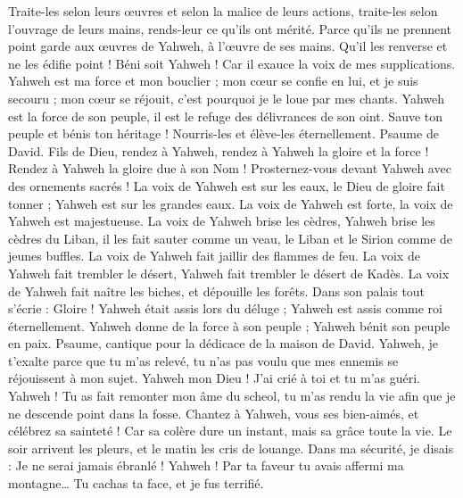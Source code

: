 \begin{multicols}{2}
Traite-les selon leurs œuvres et selon la malice de leurs actions, traite-les selon l'ouvrage de leurs mains, rends-leur ce qu'ils ont mérité.
Parce qu'ils ne prennent point garde aux œuvres de Yahweh, à l'œuvre de ses mains. Qu’il les renverse et ne les édifie point !
Béni soit Yahweh ! Car il exauce la voix de mes supplications.
Yahweh est ma force et mon bouclier ; mon cœur se confie en lui, et je suis secouru ; mon cœur se réjouit, c'est pourquoi je le loue par mes chants.
Yahweh est la force de son peuple, il est le refuge des délivrances de son oint.
Sauve ton peuple et bénis ton héritage ! Nourris-les et élève-les éternellement.
\VerseOne{}Psaume de David. Fils de Dieu, rendez à Yahweh, rendez à Yahweh la gloire et la force !
Rendez à Yahweh la gloire due à son Nom ! Prosternez-vous devant Yahweh avec des ornements sacrés !
La voix de Yahweh est sur les eaux, le Dieu de gloire fait tonner ; Yahweh est sur les grandes eaux.
La voix de Yahweh est forte, la voix de Yahweh est majestueuse.
La voix de Yahweh brise les cèdres, Yahweh brise les cèdres du Liban,
il les fait sauter comme un veau, le Liban et le Sirion comme de jeunes buffles.
La voix de Yahweh fait jaillir des flammes de feu.
La voix de Yahweh fait trembler le désert, Yahweh fait trembler le désert de Kadès.
La voix de Yahweh fait naître les biches, et dépouille les forêts. Dans son palais tout s’écrie : Gloire !
Yahweh était assis lors du déluge ; Yahweh est assis comme roi éternellement.
Yahweh donne de la force à son peuple ; Yahweh bénit son peuple en paix.
\VerseOne{}Psaume, cantique pour la dédicace de la maison de David.
Yahweh, je t'exalte parce que tu m'as relevé, tu n'as pas voulu que mes ennemis se réjouissent à mon sujet.
Yahweh mon Dieu ! J'ai crié à toi et tu m'as guéri.
Yahweh ! Tu as fait remonter mon âme du scheol, tu m'as rendu la vie afin que je ne descende point dans la fosse.
Chantez à Yahweh, vous ses bien-aimés, et célébrez sa sainteté !
Car sa colère dure un instant, mais sa grâce toute la vie. Le soir arrivent les pleurs, et le matin les cris de louange.
Dans ma sécurité, je disais : Je ne serai jamais ébranlé !
Yahweh ! Par ta faveur tu avais affermi ma montagne… Tu cachas ta face, et je fus terrifié.

\end{multicols}

